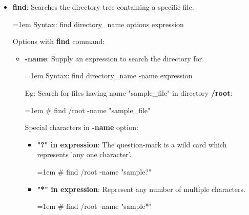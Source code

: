\setlength{\columnsep}{3pt}
\begin{flushleft}
	
	\begin{itemize}
		
		\item \textbf{find}: Searches the directory tree containing a specific file.
		\bigskip
		\begin{tcolorbox}[breakable,notitle,boxrule=-0pt,colback=pink,colframe=pink]
			\color{black}
			\font=1em
			Syntax: find directory\_name options expression
			\font=4pt
		\end{tcolorbox}
		Options with \textbf{find} command:
		\bigskip
		\begin{itemize}
			\item \textbf{-name}: Supply an expression to search the directory for.
			\bigskip
			\begin{tcolorbox}[breakable,notitle,boxrule=-0pt,colback=pink,colframe=pink]
				\color{black}
				\font=1em
				Syntax: find directory\_name -name expression
				\font=4pt
			\end{tcolorbox}
			Eg: Search for files having name "sample\_file" in directory \textbf{/root}:
			\bigskip
			\begin{tcolorbox}[breakable,notitle,boxrule=-0pt,colback=black,colframe=black]
				\color{green}
				\font=1em
				\# find /root -name "sample\_file"
				\font=4pt
			\end{tcolorbox}		
			Special characters in \textbf{-name} option:
			\begin{itemize}
				\item \textbf{"?" in expression}: The question-mark is a wild card which represents 'any one character'.
				\bigskip
				\begin{tcolorbox}[breakable,notitle,boxrule=-0pt,colback=black,colframe=black]
					\color{green}
					\font=1em
					\# find /root -name "sample?"
					\font=4pt
				\end{tcolorbox}		
				\item \textbf{"*" in expression}: Represent any number of multiple characters.
				\bigskip
				\begin{tcolorbox}[breakable,notitle,boxrule=-0pt,colback=black,colframe=black]
					\color{green}
					\fontdimen2\font=1em
					\# find /root -name "sample*"
					\fontdimen2\font=4pt
				\end{tcolorbox}		
			\end{itemize}
			

\end{itemize}
\end{itemize}
\end{flushleft}
